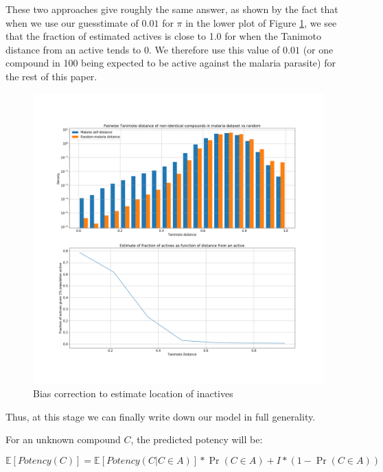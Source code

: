 \documentclass[journal=jacsat,manuscript=article]{achemso}
\begin{document}
These two approaches give roughly the same answer, as shown by the fact that when we use our guesstimate of $0.01$ for $\pi$ in the lower plot of Figure \ref{fig:mal_cluster}, we see that the fraction of estimated actives is close to 1.0 for when the Tanimoto distance from an active tends to 0.  We therefore use this value of $0.01$ (or one compound in 100 being expected to be active against the malaria parasite) for the rest of this paper. 

\begin{figure}
    \centering
    \includegraphics[width=\textwidth]{fig5_bias_correction.png}
    \caption{Bias correction to estimate location of inactives}
    \label{fig:mal_cluster}
\end{figure}
\newline
\newline

Thus, at this stage we can finally write down our model in full generality.

For an unknown compound $C$, the predicted potency will be:

\begin{equation}
    \mathbb{E}[Potency(C)] = \mathbb{E}[Potency(C | C \in A)] * \Pr(C \in A) + I * (1-\Pr(C \in A))   
\end{equation}
\end{document}
